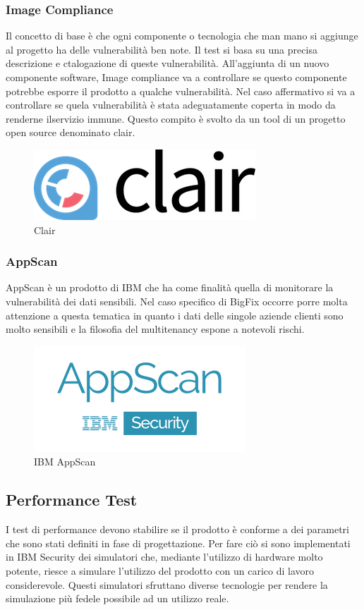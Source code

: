 \subsubsection{Image Compliance}
Il concetto di base è che ogni componente o tecnologia che man mano si aggiunge al progetto ha delle vulnerabilità ben note. Il test si basa su una precisa descrizione e ctalogazione di queste vulnerabilità. All'aggiunta di un nuovo componente software, Image compliance va a controllare se questo componente potrebbe esporre il prodotto a qualche vulnerabilità. Nel caso affermativo si va a controllare se quela vulnerabilità è stata adeguatamente coperta in modo da renderne ilservizio immune. Questo compito è svolto da un tool di un progetto open source denominato clair.
\begin{figure}[h]
	\centering
	\includegraphics[width=0.5\linewidth]{capitoli/imgs/clair}
	\caption{Clair}
	\label{fig:clair}
\end{figure}
\subsubsection{AppScan}
AppScan è un prodotto di IBM che ha come finalità quella di monitorare la vulnerabilità dei dati sensibili. Nel caso specifico di BigFix occorre porre molta attenzione a questa tematica in quanto i dati delle singole aziende clienti sono molto sensibili e la filosofia del multitenancy espone a notevoli rischi. 
\begin{figure}[h]
	\centering
	\includegraphics[width=0.5\linewidth]{capitoli/imgs/ibm-appscan-logo}
	\caption{IBM AppScan}
	\label{fig:ibm-appscan-logo}
\end{figure}

\subsection{Performance Test}
I test di performance devono stabilire se il prodotto è conforme a dei parametri che sono stati definiti in fase di progettazione. Per fare ciò si sono implementati in IBM Security dei simulatori che, mediante l'utilizzo di hardware molto potente, riesce a simulare l'utilizzo del prodotto con un carico di lavoro considerevole. Questi simulatori sfruttano diverse tecnologie per rendere la simulazione più fedele possibile ad un utilizzo reale.


